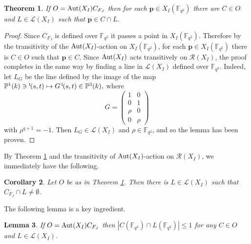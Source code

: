 \documentclass[11pt]{amsart}
\newcommand{\lt}{{}^\mathrm t\hspace{-0.5mm}}
\newcommand{\pmat}[1]{\begin{pmatrix} #1 \end{pmatrix}}
\theoremstyle{plain} %
\newtheorem{thm}{Theorem}[section] %
\newtheorem{lem}[thm]{Lemma} %
\newtheorem{cor}[thm]{Corollary} %
\theoremstyle{definition} %
\theoremstyle{remark} %
\begin{document}
\begin{thm}\label{thmcl1}
If $O={\rm Aut}(X_I)C_{F_J}$ then for each $\bm{p}\in X_I(\mathbb{F}_{q^2})$ there are $C\in O$ and $L\in\mathcal{L}(X_I)$ such that $\bm{p}\in C\cap L$.
\end{thm}
\begin{proof}
Since $C_{F_J}$ is defined over $\mathbb{F}_{q^2}$ it passes a point in $X_I(\mathbb{F}_{q^2})$. Therefore by the transitivity of the ${\rm Aut}(X_I)$-action on $X_I(\mathbb{F}_{q^2})$, for each $\bm{p}\in X_I(\mathbb{F}_{q^2})$ there is $C\in O$ such that $\bm{p}\in C$. Since ${\rm Aut}(X_I)$ acts transitively on $\mathcal{R}(X_I)$, the proof completes in the same way by finding a line in $\mathcal{L}(X_I)$ defined over $\mathbb{F}_{q^2}$.
Indeed, let $L_G$ be the line defined by the image of the map
$
\mathbb{P}^1(k)\ni\lt(s,t)\mapsto G\,\lt(s,t)\in\mathbb{P}^3(k),
$
where 
$$
G=\pmat{1&0\\0&1\\\rho&0\\0&\rho}
$$
with $\rho^{q+1}=-1$. 
Then $L_G\in\mathcal{L}(X_I)$ and $\rho\in\mathbb{F}_{q^2}$, and so the lemma has been proven.
\end{proof}
By Theorem \ref{thmcl1} and the transitivity of ${\rm Aut}(X_I)$-action on $\mathcal{R}(X_I)$, we immediately have the following.
\begin{cor}\label{corcl}
Let $O$ be as in Theorem \ref{thmcl1}. Then there is $L\in\mathcal{L}(X_I)$ such that $C_{F_J}\cap L\neq\emptyset$.
\end{cor}
The following lemma is a key ingredient.
\begin{lem}\label{lemcl}
If $O={\rm Aut}(X_I)C_{F_J}$ then
$|C(\mathbb{F}_{q^2})\cap L(\mathbb{F}_{q^2})|\le1$ for any $C\in O$ and $L\in\mathcal{L}(X_I)$.
\end{lem}
\end{document}

